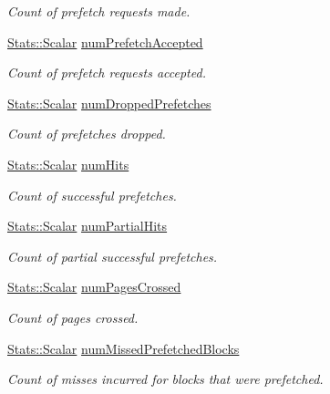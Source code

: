 \begin{DoxyCompactItemize}
\begin{DoxyCompactList}\small\item\em Count of prefetch requests made. \item\end{DoxyCompactList}\item 
\hyperlink{classStats_1_1Scalar}{Stats::Scalar} \hyperlink{classPrefetcher_a9644f1356b157e6cf7e86db7a9356be7}{numPrefetchAccepted}
\begin{DoxyCompactList}\small\item\em Count of prefetch requests accepted. \item\end{DoxyCompactList}\item 
\hyperlink{classStats_1_1Scalar}{Stats::Scalar} \hyperlink{classPrefetcher_a4165aaa9b3590259a258114e9469c74e}{numDroppedPrefetches}
\begin{DoxyCompactList}\small\item\em Count of prefetches dropped. \item\end{DoxyCompactList}\item 
\hyperlink{classStats_1_1Scalar}{Stats::Scalar} \hyperlink{classPrefetcher_a1651af6d8d96734f82a6e95a8aea4af0}{numHits}
\begin{DoxyCompactList}\small\item\em Count of successful prefetches. \item\end{DoxyCompactList}\item 
\hyperlink{classStats_1_1Scalar}{Stats::Scalar} \hyperlink{classPrefetcher_a46a96500ada7b244799f94064bf2b24d}{numPartialHits}
\begin{DoxyCompactList}\small\item\em Count of partial successful prefetches. \item\end{DoxyCompactList}\item 
\hyperlink{classStats_1_1Scalar}{Stats::Scalar} \hyperlink{classPrefetcher_a40bc6d68ddd4537932b2ac90e93dee85}{numPagesCrossed}
\begin{DoxyCompactList}\small\item\em Count of pages crossed. \item\end{DoxyCompactList}\item 
\hyperlink{classStats_1_1Scalar}{Stats::Scalar} \hyperlink{classPrefetcher_a7131480b702efc8b888a80270c77aab2}{numMissedPrefetchedBlocks}
\begin{DoxyCompactList}\small\item\em Count of misses incurred for blocks that were prefetched. \item\end{DoxyCompactList}\end{DoxyCompactItemize}


